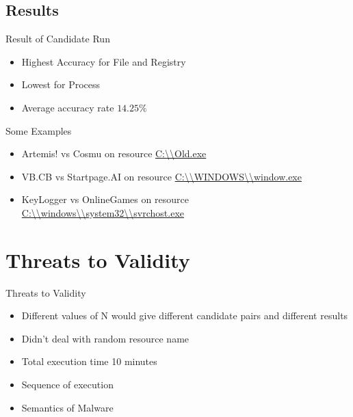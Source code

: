 \documentclass[]{beamer}
\begin{document}
\subsection{Results}
\label{sub:Results}
\begin{frame}[t]{Result of Candidate Run}
\begin{itemize}
  \item Highest Accuracy for File and Registry
  \item Lowest for Process
  \item Average accuracy rate $14.25\%$
\end{itemize}
\end{frame}
\begin{frame}{Some Examples}
  \begin{itemize}
    \item Artemis! vs Cosmu on resource \url{C:\\Old.exe}
    \item VB.CB vs Startpage.AI on resource \url{C:\\WINDOWS\\window.exe}
    \item KeyLogger vs OnlineGames on resource \url{C:\\windows\\system32\\svrchost.exe}
  \end{itemize}
\end{frame}
\section{Threats to Validity}
\begin{frame}{Threats to Validity}
  \begin{itemize}
    \item Different values of N would give different candidate pairs and different results
    \item Didn't deal with random resource name
    \item Total execution time 10 minutes
    \item Sequence of execution
    \item Semantics of Malware
  \end{itemize}
\end{frame}
\end{document}
